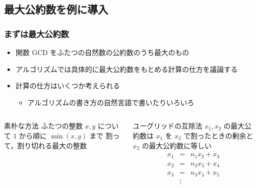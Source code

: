 \subsection{最大公約数を例に導入}
\begin{frame}
\frametitle{まずは最大公約数}
  \begin{itemize}
\item 関数 GCD をふたつの自然数の公約数のうち最大のもの
\item アルゴリズムでは具体的に最大公約数をもとめる計算の仕方を議論する
\item 計算の仕方はいくつか考えられる
    \begin{itemize}
\item アルゴリズムの書き方の自然言語で書いたりいろいろ
    \end{itemize}
  \end{itemize}
  \begin{columns}[t]
    \begin{column}{0.5\textwidth}
      \begin{block}{素朴な方法}
ふたつの整数 \(x, y\) について $1$ から順に \(\min(x,y)\) まで
割って，割り切れる最大の整数
      \end{block}
    \end{column}
    \begin{column}{0.5\textwidth}
      \begin{block}{ユーグリッドの互除法}
\scriptsize
\(x_1, x_2\) の最大公約数は $x_1$ を $x_2$ で割ったときの剰余と $x_2$ の最大公約数に等しい
        \begin{displaymath}
          \begin{array}{rcl}
x_1 &=& n_1 x_2 + x_3\\
x_2 &=& n_2 x_3 + x_4\\
x_3 &=& n_3 x_4 + x_5\\
&\vdots&
          \end{array}
        \end{displaymath}
      \end{block}
    \end{column}
  \end{columns}
\end{frame}
